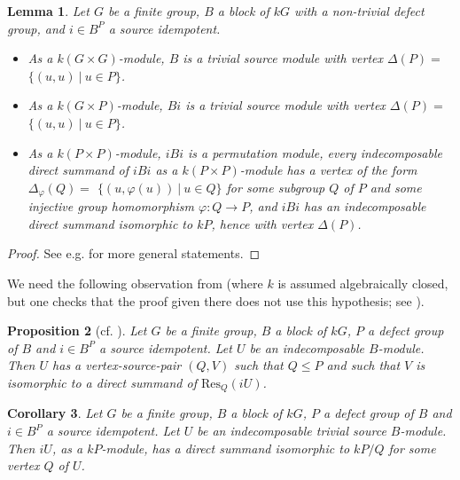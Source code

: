 \documentclass{amsart}
\theoremstyle{plain}\newtheorem{Theorem}{Theorem}[section]
\theoremstyle{plain}\newtheorem{Conjecture}[Theorem]{Conjecture}
\theoremstyle{plain}\newtheorem{Corollary}[Theorem]{Corollary}
\theoremstyle{plain}\newtheorem{Lemma}[Theorem]{Lemma}
\theoremstyle{plain}\newtheorem{Proposition}[Theorem]{Proposition}
\theoremstyle{definition}\newtheorem{Definition}[Theorem]{Definition}
\theoremstyle{definition}\newtheorem{Example}[Theorem]{Example}
\theoremstyle{definition}\newtheorem{Examples}[Theorem]{Examples}
\theoremstyle{definition}\newtheorem{Exercise}[Theorem]{Exercise}
\theoremstyle{definition}\newtheorem{Notation}[Theorem]{Notation}
\theoremstyle{definition}\newtheorem{Remark}[Theorem]{Remark}
\theoremstyle{definition}\newtheorem{Remarks}[Theorem]{Remarks}
\theoremstyle{plain}\newtheorem{Statement}[Theorem]{}
\def\Res{\mathrm{Res}}           \def\tenOR{\otimes_{\mathcal{O}R}}
\begin{document}
\begin{Lemma}\label{source-bimod-Lemma}
Let $G$ be a finite group, $B$ a block of $kG$ with a non-trivial defect group,
and $i\in B^P$ a source idempotent.
\begin{itemize}
\item[{\rm (i)}]
As a $k(G\times G)$-module, $B$ is a trivial  source module with vertex 
$\Delta(P)=$ $\{(u,u)\ | \ u\in P\}$.
\item[{\rm (ii)}]
As a $k(G\times P)$-module, $Bi$ is a trivial  source module with vertex 
$\Delta(P)=$ $\{(u,u)\ | \ u\in P\}$.
\item[{\rm (iii)}]
As a $k(P\times P)$-module, $iBi$ is a permutation module, every 
indecomposable direct summand of $iBi$ as a $k(P\times P)$-module
has a vertex of the form $\Delta_\varphi(Q)=$ $\{(u,\varphi(u))\ |\ u\in Q\}$
for some subgroup $Q$ of $P$ and some injective group homomorphism
$\varphi : Q\to P$, and $iBi$ has an indecomposable direct summand
isomorphic to $kP$, hence with vertex $\Delta(P)$.
\end{itemize}
\end{Lemma}

\begin{proof}
See e.g. \cite[Theorems 6.2.1,  6.15.1,  8.7.1]{LiBookII} for more general statements.
\end{proof}

 We need the following 
observation from \cite{LiKleinfour}  (where $k$ is assumed algebraically closed, 
but one checks that the proof given there  does not use this hypothesis; see 
\cite[Theorem 6.4.10]{LiBookII}).

\begin{Proposition}[{cf. \cite[Proposition 6.3]{LiKleinfour}}] \label{iU-vertices}
Let $G$ be a finite group, $B$ a block of $kG$, $P$ a defect group of $B$ and
$i\in B^P$ a source idempotent. Let $U$ be an indecomposable $B$-module.
Then $U$ has a vertex-source-pair $(Q,V)$ such that $Q\leq P$ and such
that $V$ is isomorphic to a direct summand of $\Res_Q(iU)$.
\end{Proposition}


\begin{Corollary}\label{iU-permutation-summands}
Let $G$ be a finite group, $B$ a block of $kG$, $P$ a defect group of $B$ and
$i\in B^P$ a source idempotent. Let $U$ be an indecomposable trivial source 
$B$-module. Then $iU$, as a $kP$-module, has a direct summand isomorphic
to $kP/Q$ for some vertex $Q$ of $U$.
\end{Corollary}
\end{document}
